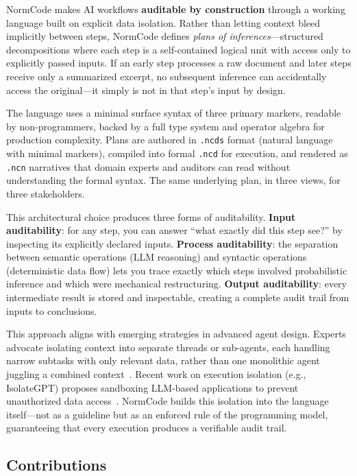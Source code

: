 NormCode makes AI workflows \textbf{auditable by construction} through a working language built on explicit data isolation. Rather than letting context bleed implicitly between steps, NormCode defines \textit{plans of inferences}---structured decompositions where each step is a self-contained logical unit with access only to explicitly passed inputs. If an early step processes a raw document and later steps receive only a summarized excerpt, no subsequent inference can accidentally access the original---it simply is not in that step's input by design.

The language uses a minimal surface syntax of three primary markers, readable by non-programmers, backed by a full type system and operator algebra for production complexity. Plans are authored in \texttt{.ncds} format (natural language with minimal markers), compiled into formal \texttt{.ncd} for execution, and rendered as \texttt{.ncn} narratives that domain experts and auditors can read without understanding the formal syntax. The same underlying plan, in three views, for three stakeholders.

This architectural choice produces three forms of auditability. \textbf{Input auditability}: for any step, you can answer ``what exactly did this step see?'' by inspecting its explicitly declared inputs. \textbf{Process auditability}: the separation between semantic operations (LLM reasoning) and syntactic operations (deterministic data flow) lets you trace exactly which steps involved probabilistic inference and which were mechanical restructuring. \textbf{Output auditability}: every intermediate result is stored and inspectable, creating a complete audit trail from inputs to conclusions.

This approach aligns with emerging strategies in advanced agent design. Experts advocate isolating context into separate threads or sub-agents, each handling narrow subtasks with only relevant data, rather than one monolithic agent juggling a combined context~\cite{ruan2024}. Recent work on execution isolation (e.g., IsolateGPT) proposes sandboxing LLM-based applications to prevent unauthorized data access~\cite{wu2025}. NormCode builds this isolation into the language itself---not as a guideline but as an enforced rule of the programming model, guaranteeing that every execution produces a verifiable audit trail.

\subsection{Contributions}

